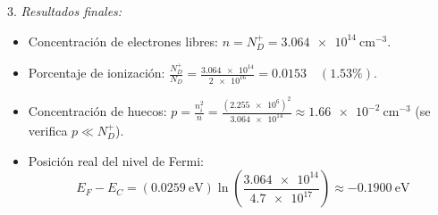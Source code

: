 \begin{problema}
3. \textit{Resultados finales:}
\begin{itemize}
    \item Concentración de electrones libres: $n = N_D^+ = \SI{3.064e14}{\cm^{-3}}$.
    \item Porcentaje de ionización: $\frac{N_D^+}{N_D} = \frac{\num{3.064e14}}{\num{2e16}} = 0.0153 \quad (1.53\%)$.
    \item Concentración de huecos: $p = \frac{n_i^2}{n} = \frac{(\num{2.255e6})^2}{\num{3.064e14}} \approx \SI{1.66e-2}{\cm^{-3}}$ (se verifica $p \ll N_D^+$).
    \item Posición real del nivel de Fermi:
    \[
    E_F - E_C = (\SI{0.0259}{\eV}) \ln\left( \frac{\num{3.064e14}}{\num{4.7e17}} \right) \approx \SI{-0.1900}{\eV}
    \]
\end{itemize}
\end{problema}

